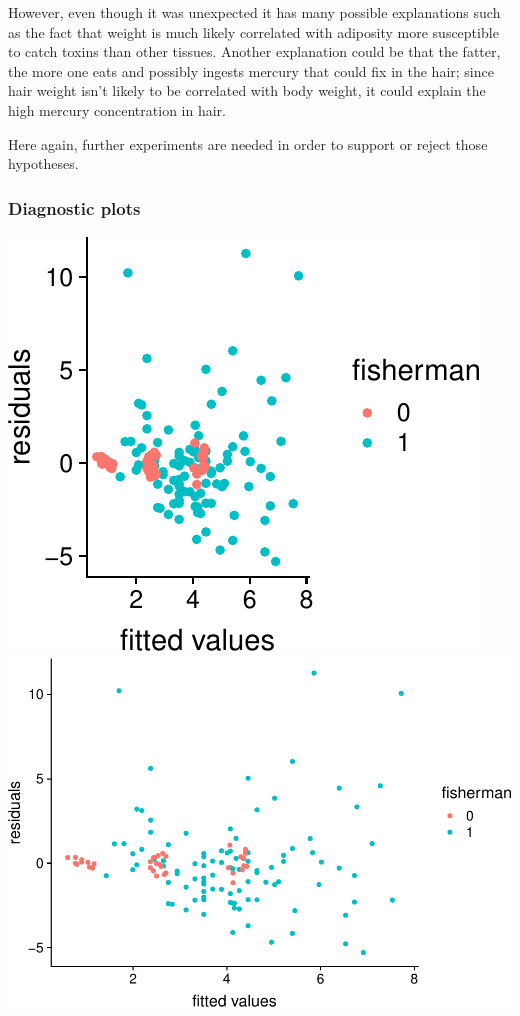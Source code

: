 \documentclass[12pt,]{article}
\begin{document}
However, even though it was unexpected it has many possible explanations
such as the fact that weight is much likely correlated with adiposity
more susceptible to catch toxins than other tissues. Another explanation
could be that the fatter, the more one eats and possibly ingests mercury
that could fix in the hair; since hair weight isn't likely to be
correlated with body weight, it could explain the high mercury
concentration in hair.

Here again, further experiments are needed in order to support or reject
those hypotheses.

\subsubsection{Diagnostic plots}\label{diagnostic-plots}

\includegraphics{Report_files/figure-latex/unnamed-chunk-16-1.pdf}
\includegraphics{Report_files/figure-latex/unnamed-chunk-16-2.pdf}
\end{document}
